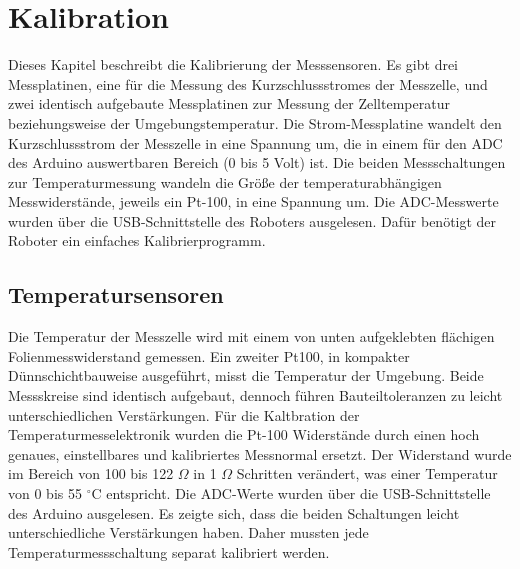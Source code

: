 \documentclass[a4paper,bibtotoc,oneside]{scrbook}
\begin{document}
\chapter{Kalibration}\thispagestyle{empty}

Dieses Kapitel beschreibt die Kalibrierung der Messsensoren. Es gibt drei Messplatinen, eine für die Messung des Kurzschlussstromes der Messzelle, und zwei identisch aufgebaute Messplatinen zur Messung der Zelltemperatur beziehungsweise der Umgebungstemperatur. Die Strom-Messplatine wandelt den Kurzschlussstrom der Messzelle in eine Spannung um, die in einem für den ADC des Arduino auswertbaren Bereich (0 bis 5 Volt) ist. Die beiden Messschaltungen zur Temperaturmessung wandeln die Größe der temperaturabhängigen Messwiderstände, jeweils ein Pt-100, in eine Spannung um.
Die ADC-Messwerte wurden über die USB-Schnittstelle des Roboters ausgelesen. Dafür benötigt der Roboter ein einfaches Kalibrierprogramm.



\section{Temperatursensoren}\thispagestyle{empty}
Die Temperatur der Messzelle wird mit einem von unten aufgeklebten flächigen Folienmesswiderstand gemessen. 
Ein zweiter Pt100, in kompakter Dünnschichtbauweise ausgeführt, misst die Temperatur der Umgebung. Beide Messskreise sind identisch aufgebaut, dennoch führen Bauteiltoleranzen zu leicht unterschiedlichen Verstärkungen.
Für die Kaltbration der Temperaturmesselektronik wurden die Pt-100 Widerstände durch einen hoch genaues, einstellbares und kalibriertes Messnormal ersetzt. Der Widerstand wurde im Bereich von 100 bis 122 	$\Omega$  in 1 $\Omega$  Schritten verändert, was einer Temperatur von 0 bis 55 $^{\circ}$C entspricht. Die ADC-Werte wurden über die USB-Schnittstelle des Arduino ausgelesen. Es zeigte sich, dass die beiden Schaltungen leicht unterschiedliche Verstärkungen haben. Daher mussten jede Temperaturmessschaltung separat kalibriert werden.
\end{document}
